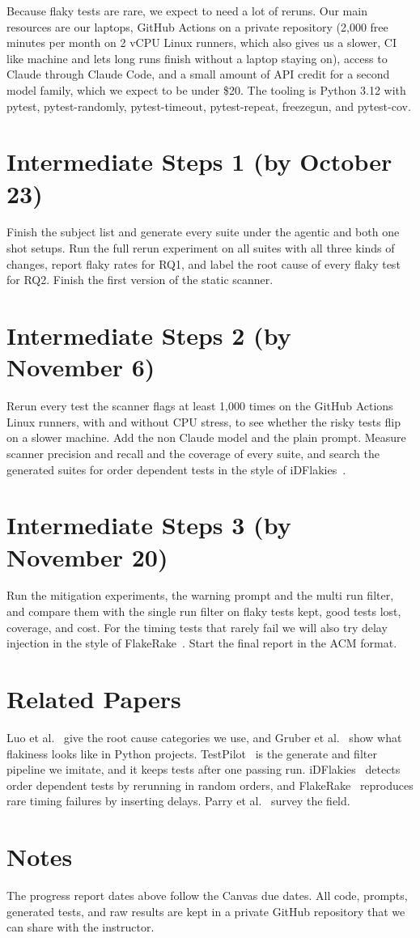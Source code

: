 \documentclass[sigconf,nonacm]{acmart}
\begin{document}
Because flaky tests are rare, we expect to need a lot of reruns. Our main resources are our laptops, GitHub Actions on a private repository (2,000 free minutes per month on 2 vCPU Linux runners, which also gives us a slower, CI like machine and lets long runs finish without a laptop staying on), access to Claude through Claude Code, and a small amount of API credit for a second model family, which we expect to be under \$20. The tooling is Python 3.12 with pytest, pytest-randomly, pytest-timeout, pytest-repeat, freezegun, and pytest-cov.

\section{Intermediate Steps 1 (by October 23)}
Finish the subject list and generate every suite under the agentic and both one shot setups. Run the full rerun experiment on all suites with all three kinds of changes, report flaky rates for RQ1, and label the root cause of every flaky test for RQ2. Finish the first version of the static scanner.

\section{Intermediate Steps 2 (by November 6)}
Rerun every test the scanner flags at least 1,000 times on the GitHub Actions Linux runners, with and without CPU stress, to see whether the risky tests flip on a slower machine. Add the non Claude model and the plain prompt. Measure scanner precision and recall and the coverage of every suite, and search the generated suites for order dependent tests in the style of iDFlakies~\cite{lam2019}.

\section{Intermediate Steps 3 (by November 20)}
Run the mitigation experiments, the warning prompt and the multi run filter, and compare them with the single run filter on flaky tests kept, good tests lost, coverage, and cost. For the timing tests that rarely fail we will also try delay injection in the style of FlakeRake~\cite{rahman2024}. Start the final report in the ACM format.

\section{Related Papers}
Luo et al.~\cite{luo2014} give the root cause categories we use, and Gruber et al.~\cite{gruber2021} show what flakiness looks like in Python projects. TestPilot~\cite{schafer2024} is the generate and filter pipeline we imitate, and it keeps tests after one passing run. iDFlakies~\cite{lam2019} detects order dependent tests by rerunning in random orders, and FlakeRake~\cite{rahman2024} reproduces rare timing failures by inserting delays. Parry et al.~\cite{parry2021} survey the field.

\section{Notes}
The progress report dates above follow the Canvas due dates. All code, prompts, generated tests, and raw results are kept in a private GitHub repository that we can share with the instructor.



\end{document}

